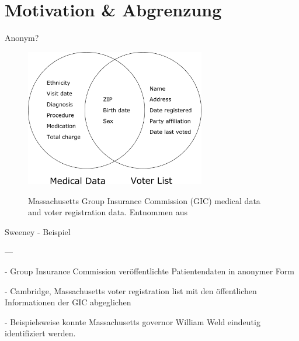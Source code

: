 \section{Motivation \& Abgrenzung}

\begin{frame}{Anonym?}

\begin{figure}%
	\centering
	\includegraphics[width=0.7\textwidth]{pic/sweeney_governor.pdf}
	\vspace{0.2cm}

	\tiny Massachusetts Group Insurance Commission (GIC) medical data and voter registration data. Entnommen aus \cite{sweeney_k_anonymity}
\end{figure}

Sweeney - Beispiel \cite{sweeney_k_anonymity}

---

- Group Insurance Commission veröffentlichte Patientendaten in anonymer Form

- Cambridge, Massachusetts voter registration list mit den öffentlichen Informationen der GIC abgeglichen

- Beispielsweise konnte Massachusetts governor William Weld eindeutig identifiziert werden.
\end{frame}

